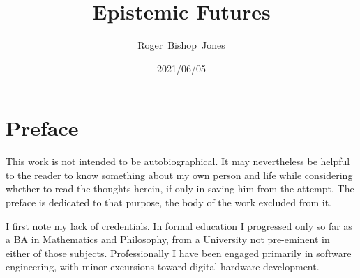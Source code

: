 \documentclass[10pt,titlepage]{book}
\title{\LARGE\bf Epistemic Futures}
\author{Roger~Bishop~Jones}
\date{\small 2021/06/05}
\newcommand{\ignore}[1]{}
\begin{document}
\frontmatter

                               
\begin{titlepage}
\maketitle

\ignore{
\vfill

\begin{centering}

{\footnotesize
\copyright\ Roger~Bishop~Jones;
}%

\end{centering}
}%

\end{titlepage}

\setcounter{tocdepth}{2}

{\parskip-0pt\tableofcontents}

\mainmatter


\pagebreak

\section*{Preface}


This work is not intended to be autobiographical.
It may nevertheless be helpful to the reader to know something about my own person and life while considering whether to read the thoughts herein, if only in saving him from the attempt.
The preface is dedicated to that purpose, the body of the work excluded from it.

I first note my lack of credentials.
In formal education I progressed only so far as a BA in Mathematics and Philosophy, from a University not pre-eminent in either of those subjects.
Professionally I have been engaged primarily in software engineering, with minor excursions toward digital hardware development.
\end{document}
